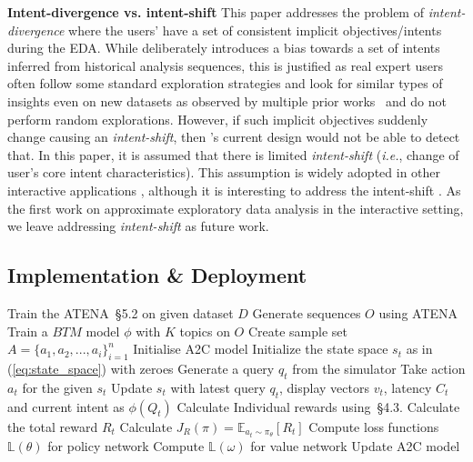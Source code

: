\noindent\textbf{Intent-divergence vs. intent-shift}
This paper addresses the problem of \textit{intent-divergence} where the users' have a set of consistent implicit objectives/intents during the EDA. 
While \name{} deliberately introduces a bias towards a set of intents inferred from historical analysis sequences, this is justified as real expert users often follow some standard exploration strategies and look for similar types of insights even on new datasets as observed by multiple prior works~\cite{atena2020sigmod, jain2016sqlshare, milo2018next} and do not perform random explorations.
However, if such implicit objectives suddenly change causing an \textit{intent-shift}, then \name{}'s current design would not be able to detect that. 
In this paper, it is assumed that there is limited \textit{intent-shift} (\emph{i.e.}, change of user's core intent characteristics). 
This assumption is widely adopted in other interactive applications \cite{liu2018dialogue,guo2018dialog,tan2019drill}, although it is interesting to address the intent-shift \cite{xie2021tiage,arnold2019sector}. As the first work on approximate exploratory data analysis in the interactive setting, we leave addressing \textit{intent-shift} as future work.

\subsection{Implementation \& Deployment}

\begin{algorithm}[th]
        \begin{algorithmic}[1]
        \label{alg:alg1}
        \caption{\name{}'s Training Algorithm}
        \STATE Train the ATENA~\S{5.2} on given dataset $D$
        \STATE Generate sequences $O$ using ATENA
        \STATE Train a $BTM$ model $\phi$ with $K$ topics on $O$
        \STATE Create sample set $A=\{a_1,a_2,...,a_i\}_{i=1}^n$
        \STATE Initialise A2C model
            \STATE Initialize the state space $s_t$ as in (\ref{eq:state_space}) with zeroes
                    \STATE Generate a query $q_t$ from the simulator
                    \STATE Take action $a_t$ for the given $s_t$
                    \STATE Update $s_t$ with latest query $q_t$, display vectors $v_t$, latency $C_t$ and current intent as $\phi(Q_t)$
            \ENDFOR
            \STATE Calculate Individual rewards using~\S{4.3}.
            \STATE Calculate the total reward $R_t$
            \STATE Calculate $J_R(\pi) = \mathbb{E}_{a_t \sim \pi_\theta}[R_t]$
            \STATE Compute loss functions $\mathbb{L}(\theta)$ for policy network
            \STATE Compute $\mathbb{L}(\omega)$ for value network
            \STATE Update A2C model
        \ENDFOR
        \end{algorithmic}
    \end{algorithm}

